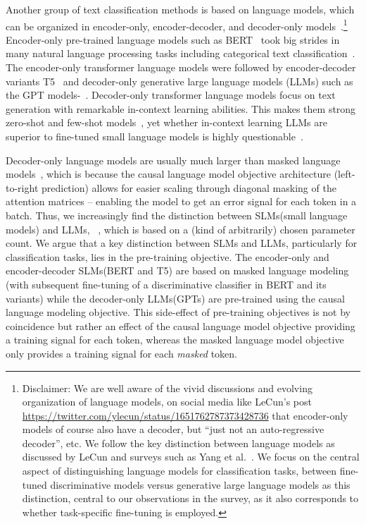 \documentclass[acmsmall,nonacm]{acmart}
\newcommand{\SLMs}{SLMs\xspace}
\newcommand{\LLMs}{LLMs\xspace}
\begin{document}
Another group of text classification methods is based on language models, which can be organized in encoder-only, encoder-decoder, and decoder-only models~\cite{yang2023harnessing}.\footnote{Disclaimer:
We are well aware of the vivid discussions and evolving organization of language models, \eg on social media like LeCun's post \url{https://twitter.com/ylecun/status/1651762787373428736} that encoder-only models of course also have a decoder, but ``just not an auto-regressive decoder'', etc.    
We follow the key distinction between language models as discussed by LeCun and surveys such as Yang et al.~\cite{yang2023harnessing}.
We focus on the central aspect of distinguishing language models for classification tasks, \ie between fine-tuned discriminative models versus generative large language models as this distinction, central to our observations in the survey, as it also corresponds to whether task-specific fine-tuning is employed.
}
Encoder-only pre-trained language models such as BERT~\cite{DBLP:conf/naacl/DevlinCLT19} took big strides in many natural language processing tasks including categorical text classification~\cite{galke2023really,galkescherp-acl2022}. 
The encoder-only transformer language models were followed by encoder-decoder variants T5~\cite{T5} and decoder-only generative large language models (\LLMs) such as the GPT models-~\cite{DBLP:journals/corr/abs-2303-08774,DBLP:conf/nips/BrownMRSKDNSSAA20}.
Decoder-only transformer language models focus on text generation with remarkable in-context learning abilities.
This makes them strong zero-shot and few-shot models~\cite{carp,DBLP:conf/iclr/PatelLRCRC23,wei2022finetuned,DBLP:conf/nips/BrownMRSKDNSSAA20}, 
yet whether in-context learning LLMs are superior to fine-tuned small language models is highly questionable~\cite{DBLP:conf/acl/QoribMN24,
bucher2024finetunedsmallllmsstill,
lepagnol2024smalllanguagemodelsgood,
liu2024llmembedrethinkinglightweightllms,
edwards2024language,
li2023label}.

Decoder-only language models are usually much larger than masked language models~\cite{DBLP:conf/nips/BrownMRSKDNSSAA20}, which is because the causal language model objective architecture (left-to-right prediction) allows for easier scaling through diagonal masking of the attention matrices -- enabling the model to get an error signal for each token in a batch.
Thus, we increasingly find the distinction between \SLMs (small language models) and \LLMs, \eg~\cite{DBLP:conf/aaai/Hu0CSLW024,DBLP:journals/corr/abs-2402.12819,DBLP:journals/corr/abs-2402-16844}, which is based on a (kind of arbitrarily) chosen parameter count.
We argue that a key distinction between \SLMs and \LLMs, particularly for classification tasks, lies in the pre-training objective.
The encoder-only and encoder-decoder \SLMs (\eg BERT and T5) are based on masked language modeling (with subsequent fine-tuning of a discriminative classifier in BERT and its variants) while the decoder-only \LLMs (\eg GPTs) are pre-trained using the causal language modeling objective.
This side-effect of pre-training objectives is not by coincidence but rather an effect of the causal language model objective providing a training signal for each token, whereas the masked language model objective only provides a training signal for each \emph{masked} token.
\end{document}
